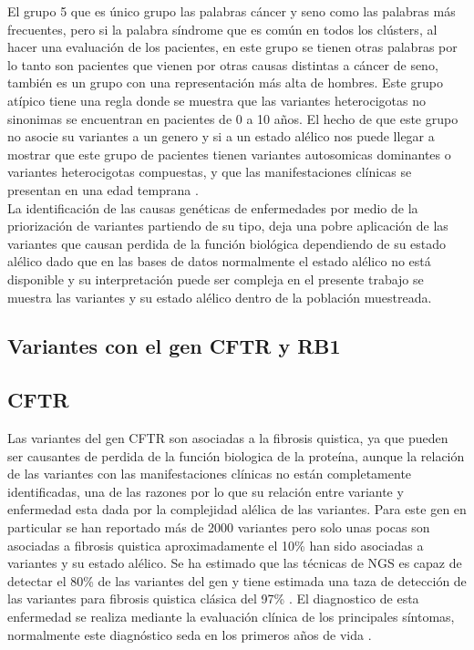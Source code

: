 El grupo 5 que es único grupo las palabras cáncer y seno como las palabras más frecuentes, pero si la palabra síndrome que es común en todos los clústers, al hacer una evaluación de los pacientes, en este grupo se tienen otras palabras por lo tanto son pacientes que vienen por otras causas distintas a cáncer de seno, también es un grupo con una representación más alta de hombres. Este grupo atípico tiene una regla donde se muestra que las variantes heterocigotas no sinonimas se encuentran  en pacientes de 0 a 10 años. El hecho de que este grupo no asocie su variantes a un genero y si a un estado alélico nos puede llegar a mostrar que este grupo de pacientes tienen variantes autosomicas dominantes o variantes heterocigotas compuestas, y que las manifestaciones clínicas se presentan en una edad temprana \cite{Kamphans2013}. \\

La identificación de las causas genéticas de enfermedades por medio de la priorización de variantes partiendo de su tipo, deja una pobre aplicación de las variantes que causan perdida de la función biológica dependiendo de su estado alélico \cite{Eilbeck2017} dado que en las bases de datos normalmente el estado alélico no está disponible y su interpretación puede ser compleja \cite{Stenson2017} en el presente trabajo se muestra las variantes y su estado alélico dentro de la población muestreada. 


\subsection{Variantes con el gen CFTR y RB1}

\subsection*{CFTR}

Las variantes del gen CFTR son asociadas a la fibrosis quistica, ya que pueden ser causantes de perdida de la función biologica de la proteína, aunque la relación de las variantes con las manifestaciones clínicas no están completamente identificadas, una de las razones por lo que su relación entre variante y enfermedad esta dada por la complejidad alélica de las variantes. Para este gen en particular se han reportado más de 2000 variantes pero solo unas pocas son asociadas a fibrosis quistica aproximadamente el 10\% han sido asociadas a variantes y su estado alélico. Se ha estimado que las técnicas de NGS es capaz de detectar el 80\% de las variantes del gen y tiene estimada una taza de detección de las variantes para fibrosis quistica clásica del 97\% \cite{Rowntree2003,Terlizzi2017b,Farrell2016}. El diagnostico de esta enfermedad se realiza mediante la evaluación clínica de los principales síntomas, normalmente este diagnóstico seda en los primeros años de vida \cite{Terlizzi2017b}.\\

